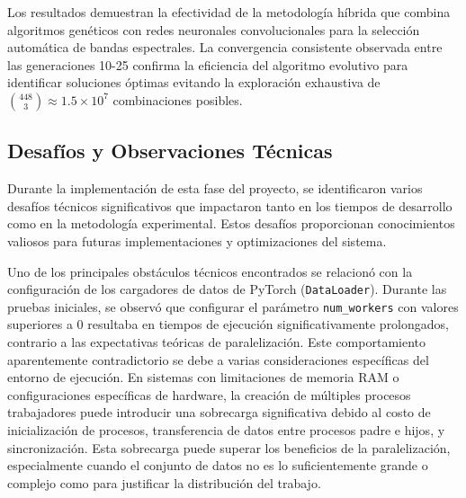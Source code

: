Los resultados demuestran la efectividad de la metodología híbrida que combina algoritmos genéticos con redes neuronales convolucionales para la selección automática de bandas espectrales. La convergencia consistente observada entre las generaciones 10-25 confirma la eficiencia del algoritmo evolutivo para identificar soluciones óptimas evitando la exploración exhaustiva de $\binom{448}{3} \approx 1.5 \times 10^7$ combinaciones posibles.

\subsection{Desafíos y Observaciones Técnicas}

Durante la implementación de esta fase del proyecto, se identificaron varios desafíos técnicos significativos que impactaron tanto en los tiempos de desarrollo como en la metodología experimental. Estos desafíos proporcionan conocimientos valiosos para futuras implementaciones y optimizaciones del sistema.

\vspace{5mm}

Uno de los principales obstáculos técnicos encontrados se relacionó con la configuración de los cargadores de datos de PyTorch (\texttt{DataLoader}). Durante las pruebas iniciales, se observó que configurar el parámetro \texttt{num\_workers} con valores superiores a 0 resultaba en tiempos de ejecución significativamente prolongados, contrario a las expectativas teóricas de paralelización. Este comportamiento aparentemente contradictorio se debe a varias consideraciones específicas del entorno de ejecución. En sistemas con limitaciones de memoria RAM o configuraciones específicas de hardware, la creación de múltiples procesos trabajadores puede introducir una sobrecarga significativa debido al costo de inicialización de procesos, transferencia de datos entre procesos padre e hijos, y sincronización. Esta sobrecarga puede superar los beneficios de la paralelización, especialmente cuando el conjunto de datos no es lo suficientemente grande o complejo como para justificar la distribución del trabajo.

\vspace{5mm}

